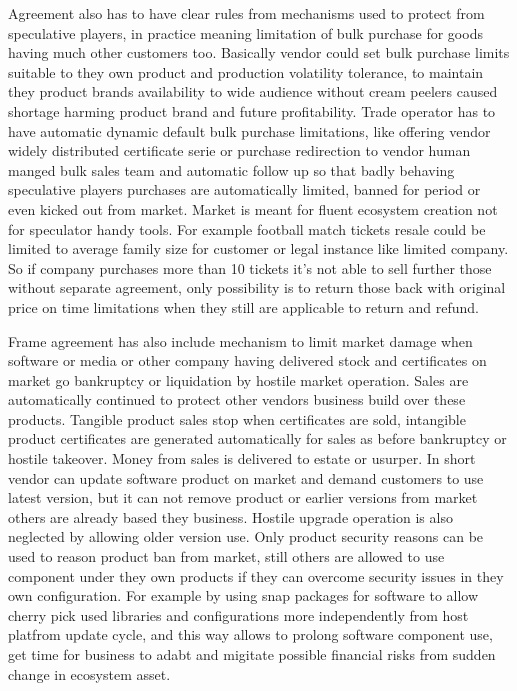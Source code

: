 Agreement also has to have clear rules from mechanisms used to protect from
speculative players, in practice meaning limitation of bulk purchase for goods
having much other customers too. Basically vendor could set bulk purchase
limits suitable to they own product and production volatility tolerance, to
maintain they product brands availability to wide audience without cream
peelers caused shortage harming product brand and future profitability.
Trade operator has to have automatic dynamic default bulk purchase
limitations, like offering vendor widely distributed certificate serie or
purchase redirection to vendor human manged bulk sales team and automatic
follow up so that badly behaving speculative players purchases are
automatically limited, banned for period or even kicked out from market.
Market is meant for fluent ecosystem creation not for speculator handy
tools. For example football match tickets resale could be limited to
average family size for customer or legal instance like limited company.
So if company purchases more than 10 tickets it's not able to sell further
those without separate agreement, only possibility is to return those back
with original price on time limitations when they still are applicable to
return and refund. 

Frame agreement has also include mechanism to limit market damage when
software or media or other company having delivered stock and certificates on
market go bankruptcy or liquidation by hostile market operation. Sales are
automatically continued to protect other vendors business build over these
products. Tangible product sales stop when certificates are sold, intangible
product certificates are generated automatically for sales as before
bankruptcy or hostile takeover. Money from sales is delivered to estate or
usurper. In short vendor can update software product on market and demand
customers to use latest version, but it can not remove product or earlier
versions from market others are already based they business. Hostile upgrade
operation is also neglected by allowing older version use. Only product
security reasons can be used to reason product ban from market, still others
are allowed to use component under they own products if they can overcome
security issues in they own configuration. For example by using snap packages
for software to allow cherry pick used libraries and configurations more
independently from host platfrom update cycle, and this way allows to prolong
software component use, get time for business to adabt and migitate possible
financial risks from sudden change in ecosystem asset.

